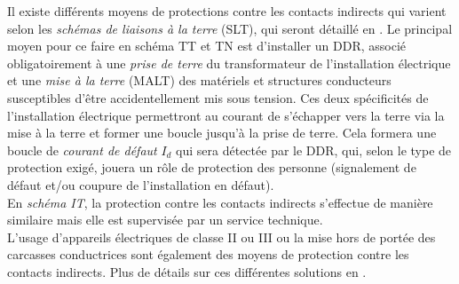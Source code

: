 Il existe différents moyens de protections contre les contacts indirects qui varient selon les \emph{schémas de liaisons à la terre} (SLT), qui seront détaillé en . Le principal moyen pour ce faire en schéma TT et TN est d'installer un DDR, associé obligatoirement à une \emph{prise de terre} du transformateur de l'installation électrique et une \emph{mise à la terre} (MALT) des matériels et structures conducteurs susceptibles d'être accidentellement mis sous tension. Ces deux spécificités de l'installation électrique permettront au courant de s'échapper vers la terre via la mise à la terre et former une boucle jusqu'à la prise de terre. Cela formera une boucle de \emph{courant de défaut} $I_d$ qui sera détectée par le DDR, qui, selon le type de protection exigé, jouera un rôle de protection des personne (signalement de défaut et/ou coupure de l'installation en défaut).\\
En \emph{schéma IT}, la protection contre les contacts indirects s'effectue de manière similaire mais elle est supervisée par un service technique.\\

L'usage d'appareils électriques de classe II ou III ou la mise hors de portée des carcasses conductrices sont également des moyens de protection contre les contacts indirects. Plus de détails sur ces différentes solutions en . 



